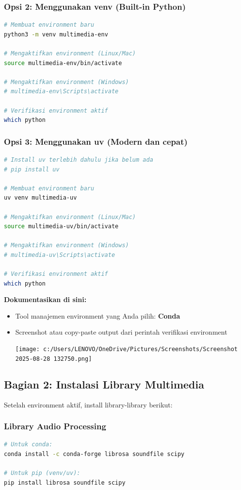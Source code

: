 \documentclass[11pt,a4paper]{article}
\begin{document}
\subsubsection{Opsi 2: Menggunakan venv (Built-in Python)}
\begin{lstlisting}[language=bash, caption=Membuat environment dengan venv]
# Membuat environment baru
python3 -m venv multimedia-env

# Mengaktifkan environment (Linux/Mac)
source multimedia-env/bin/activate

# Mengaktifkan environment (Windows)
# multimedia-env\Scripts\activate

# Verifikasi environment aktif
which python
\end{lstlisting}

\subsubsection{Opsi 3: Menggunakan uv (Modern dan cepat)}
\begin{lstlisting}[language=bash, caption=Membuat environment dengan uv]
# Install uv terlebih dahulu jika belum ada
# pip install uv

# Membuat environment baru
uv venv multimedia-uv

# Mengaktifkan environment (Linux/Mac)
source multimedia-uv/bin/activate

# Mengaktifkan environment (Windows)
# multimedia-uv\Scripts\activate

# Verifikasi environment aktif
which python
\end{lstlisting}

\textbf{Dokumentasikan di sini:}
\begin{itemize}
    \item Tool manajemen environment yang Anda pilih: \textbf{Conda}
    \item Screenshot atau copy-paste output dari perintah verifikasi environment

    \noindent
    \texttt{[image: c:/Users/LENOVO/OneDrive/Pictures/Screenshots/Screenshot 2025-08-28 132750.png]}
\end{itemize}

\subsection{Bagian 2: Instalasi Library Multimedia}
Setelah environment aktif, install library-library berikut:

\subsubsection{Library Audio Processing}
\begin{lstlisting}[language=bash, caption=Instalasi library audio]
# Untuk conda:
conda install -c conda-forge librosa soundfile scipy

# Untuk pip (venv/uv):
pip install librosa soundfile scipy
\end{lstlisting}
\end{document}
